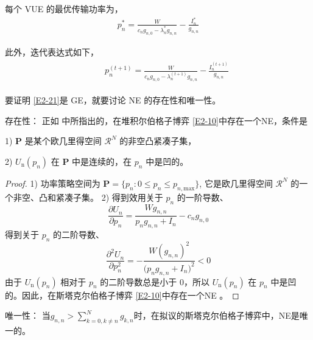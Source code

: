 每个 VUE 的最优传输功率为，
\begin{equation}\label{E2-21}
\begin{array}{*{21}{ll}}
 p_n^{*}=\frac{W}{c_n g_{n,0}-\lambda_n^{*}g_{n,n}}-\frac{I_n^{*}}{g_{n,n}}
\end{array}
\end{equation}

此外，迭代表达式如下，
\begin{eqnarray}\label{E2-22}
\begin{array}{lll}
\qquad p_n^{(t+1)}=\frac{W}{c_n g_{n,0}-\lambda_n^{(t+1)}g_{n,n}}-\frac{I_n^{(t+1)}}{g_{n,n}}
\end{array}
\end{eqnarray}

要证明 \eqref{E2-21}是 GE，就要讨论 NE 的存在性和唯一性。

存在性： 正如 \cite{GT} 中所指出的，在堆积尔伯格子博弈 \eqref{E2-10}中存在一个NE，条件是

1) $\mathbf{P}$ 是某个欧几里得空间 $\mathcal{R}^N$ 的非空凸紧凑子集，

2) $U_{\textrm{n}}(p_n)$ 在 $\mathbf{P}$ 中是连续的，在 $p_n$ 中是凹的。

\begin{proof}
1) 功率策略空间为 $\mathbf{P}=\{p_n:0\leq p_n \leq p_{n,\textrm{max}}\}$, 它是欧几里得空间 $\mathcal{R}^N$ 的一个非空、凸和紧凑子集。
2) 得到效用关于 $p_n$ 的一阶导数、
\begin{equation}\label{23}
\frac{\partial U_{n}}{\partial p_n}=\frac{Wg_{n,n}}{p_n g_{n,n}+I_n}-c_ng_{n,0}
\end{equation}
得到关于 $p_n$ 的二阶导数、
\begin{equation}\label{24}
\frac{\partial^2 U_{n}}{\partial p_n^2}=-\frac{W(g_{n,n})^2}{\big(p_n g_{n,n} +I_n\big)^2}<0
\end{equation}
由于 $U_{\textrm{n}}(p_n)$ 相对于 $p_n$ 的二阶导数总是小于 0，所以 $U_{\textrm{n}}(p_n)$ 在 $p_n$ 中是凹的。因此，在斯塔克尔伯格子博弈 \ref{E2-10}中存在一个NE 。
\end{proof}\par

唯一性： 当$g_{n,n}$$>$$\sum\limits_{k=0,k\neq n}^N g_{k,n}$时，在拟议的斯塔克尔伯格子博弈中，NE是唯一的。

